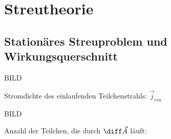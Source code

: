 \section{Streutheorie}
	\subsection{Stationäres Streuproblem und Wirkungsquerschnitt}
	BILD
		
		Stromdichte des einlaufenden Teilchenstrahls: $\vec{j}_{ein}$
	
	BILD
	
		Anzahl der Teilchen, die durch $\diff \vec{A}$ läuft:
